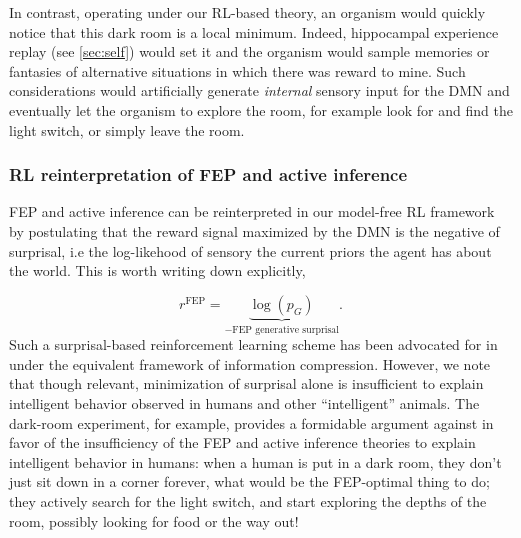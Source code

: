 \documentclass[10pt,letterpaper]{article}
\begin{document}
In contrast, operating under our RL-based theory, an organism would quickly notice that this dark room is a local minimum. Indeed, hippocampal experience replay (see \ref{sec:self}) would set it and the organism would sample memories or fantasies of alternative situations in which there was reward to mine. Such considerations would artificially generate \textit{internal} sensory input for the DMN and eventually let the organism to explore the room, for example look for and find the light switch, or simply leave the room.


\subsubsection{RL reinterpretation of FEP and active inference}  FEP and active inference can be reinterpreted in our model-free RL framework by postulating that the reward signal maximized by the DMN is the negative of surprisal, i.e the log-likehood of sensory the current priors the agent has about the world. This is worth writing down explicitly,

\begin{equation}
  r^{\text{FEP}} = \underbrace{\log (p_G)}_{-\text{FEP generative surprisal}}.
    \end{equation}
    Such a surprisal-based reinforcement learning scheme has been advocated for in \citep{schmidhuber2010,mohamed2015} under the equivalent framework of information compression.
    However, we note that though relevant, minimization of surprisal alone is insufficient to explain intelligent behavior observed in humans and other ``intelligent'' animals. The dark-room experiment, for example, provides a formidable argument against in favor of the insufficiency of the FEP and active inference theories to explain intelligent behavior in humans: when a human is put in a dark room, they don't just sit down in a corner forever, what would be the FEP-optimal thing to do; they actively search for the light switch, and start exploring the depths of the room, possibly looking for food or the way out!
\end{document}
